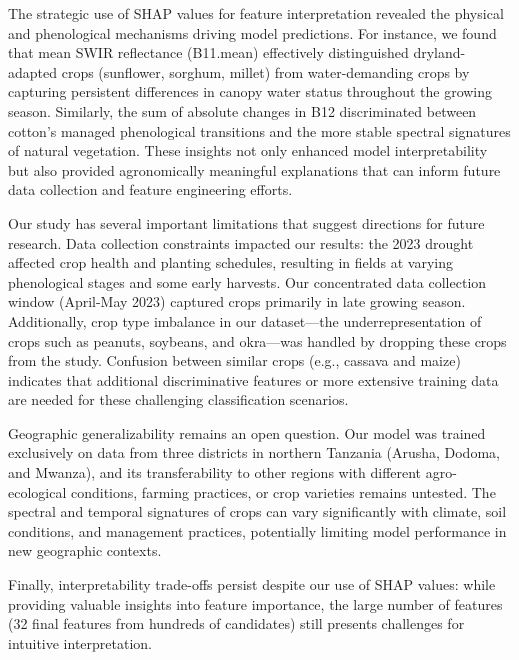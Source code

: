 \documentclass[
  journal,
  twocolumn]{IEEEtran}
\begin{document}
The strategic use of SHAP values for feature interpretation revealed the
physical and phenological mechanisms driving model predictions. For
instance, we found that mean SWIR reflectance (B11.mean) effectively
distinguished dryland-adapted crops (sunflower, sorghum, millet) from
water-demanding crops by capturing persistent differences in canopy
water status throughout the growing season. Similarly, the sum of
absolute changes in B12 discriminated between cotton's managed
phenological transitions and the more stable spectral signatures of
natural vegetation. These insights not only enhanced model
interpretability but also provided agronomically meaningful explanations
that can inform future data collection and feature engineering efforts.

Our study has several important limitations that suggest directions for
future research. Data collection constraints impacted our results: the
2023 drought affected crop health and planting schedules, resulting in
fields at varying phenological stages and some early harvests. Our
concentrated data collection window (April-May 2023) captured crops
primarily in late growing season. Additionally, crop type imbalance in
our dataset---the underrepresentation of crops such as peanuts,
soybeans, and okra---was handled by dropping these crops from the study.
Confusion between similar crops (e.g., cassava and maize) indicates that
additional discriminative features or more extensive training data are
needed for these challenging classification scenarios.

Geographic generalizability remains an open question. Our model was
trained exclusively on data from three districts in northern Tanzania
(Arusha, Dodoma, and Mwanza), and its transferability to other regions
with different agro-ecological conditions, farming practices, or crop
varieties remains untested. The spectral and temporal signatures of
crops can vary significantly with climate, soil conditions, and
management practices, potentially limiting model performance in new
geographic contexts.

Finally, interpretability trade-offs persist despite our use of SHAP
values: while providing valuable insights into feature importance, the
large number of features (32 final features from hundreds of candidates)
still presents challenges for intuitive interpretation.
\end{document}
